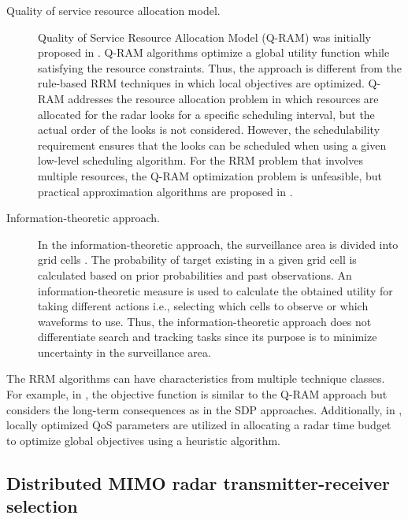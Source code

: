\documentclass[english, 12pt, a4paper, elec, utf8, a-1b, online]{aaltothesis}
\begin{document}
\begin{description}
\item[Quality of service resource allocation model.] 

Quality of Service Resource Allocation Model (Q-RAM) was initially proposed in \cite{Rajkumar1997}.
Q-RAM algorithms optimize a global utility function while satisfying the resource constraints.
Thus, the approach is different from the rule-based RRM techniques in which local objectives are optimized.
Q-RAM addresses the resource allocation problem in which resources are allocated for the radar looks for a specific scheduling interval, but the actual order of the looks is not considered.
However, the schedulability requirement ensures that the looks can be scheduled when using a given low-level scheduling algorithm. 
For the RRM problem that involves multiple resources, the Q-RAM optimization problem is unfeasible, but practical approximation algorithms are proposed in \cite{Rajkumar1998, Irci2010, Charlish2015a}.

\item[Information-theoretic approach.]

In the information-theoretic approach, the surveillance area is divided into grid cells \cite{Kastella1997, Kreucher2004, Kreucher2005, Xu2010}.
The probability of target existing in a given grid cell is calculated based on prior probabilities and past observations.
An information-theoretic measure is used to calculate the obtained utility for taking different actions i.e., selecting which cells to observe or which waveforms to use.
Thus, the information-theoretic approach does not differentiate search and tracking tasks since its purpose is to minimize uncertainty in the surveillance area.

\end{description}


\noindent
The RRM algorithms can have characteristics from multiple technique classes. 
For example, in \cite{Byrne2015, Byrne2016}, the objective function is similar to the Q-RAM approach but considers the long-term consequences as in the SDP approaches.
Additionally, in \cite{Esfahani2012}, locally optimized QoS parameters are utilized in allocating a radar time budget to optimize global objectives using a heuristic algorithm.

\subsection{Distributed MIMO radar transmitter-receiver selection}\label{sec:TX_RX_selection_review}
\end{document}
